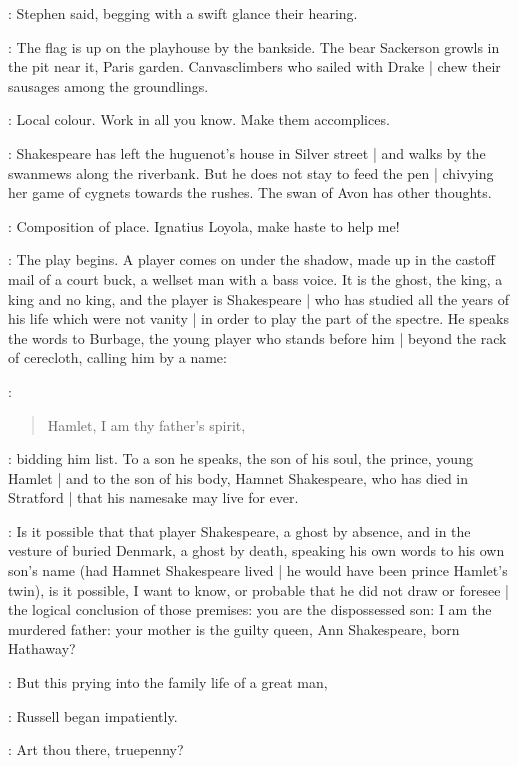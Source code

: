 :
Stephen said,
begging with a swift glance their hearing.

\Stephen:
The flag is up on the playhouse by the bankside.
The bear Sackerson growls in the pit near it,
Paris garden.
Canvasclimbers who sailed with Drake |
chew their sausages among the groundlings.

\StephenInt:
Local colour.
Work in all you know.
Make them accomplices.

\Stephen:
Shakespeare has left the huguenot's house in Silver street |
and walks by the swanmews along the riverbank.
But he does not stay to feed the pen |
chivying her game of cygnets towards the rushes.
The swan of Avon has other thoughts.

\StephenInt:
Composition of place.
Ignatius Loyola,
make haste to help me!

\Stephen:
The play begins.
A player comes on under the shadow,
made up in the castoff mail of a court buck,
a wellset man with a bass voice.
It is the ghost,
the king,
a king and no king,
and the player is Shakespeare |
who has studied 
all the years of his life which were not vanity |
in order to play the part of the spectre.
He speaks the words to Burbage,
the young player who stands before him |
beyond the rack of cerecloth,
calling him by a name:

\Stephen:
\begin{verse}
    Hamlet, I am thy father's spirit,
\end{verse}

\Stephen:
bidding him list.
To a son he speaks,
the son of his soul,
the prince,
young Hamlet |
and to the son of his body,
Hamnet Shakespeare,
who has died in Stratford |
that his namesake may live for ever.

\Stephen:
Is it possible that that player Shakespeare,
a ghost by absence,
and in the vesture of buried Denmark,
a ghost by death,
speaking his own words to his own son's name
(had Hamnet Shakespeare lived |
he would have been prince Hamlet's twin),
is it possible,
I want to know,
or probable that he did not draw or foresee |
the logical conclusion of those premises:
you are the dispossessed son:
I am the murdered father:
your mother is the guilty queen,
Ann Shakespeare,
born Hathaway?

\AErussell:
But this prying into the family life of a great man,

:
Russell began impatiently.

\StephenInt:
Art thou there,
truepenny?

